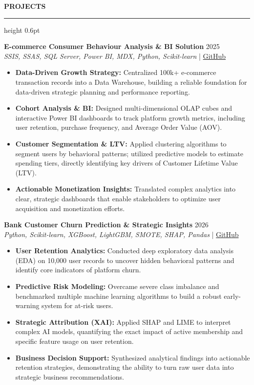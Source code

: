 ﻿\documentclass{resume}
\renewcommand{\sectionskip}{\vspace{5pt}}
\renewcommand{\sectionlineskip}{\vspace{3pt}}
\renewenvironment{rSection}[1]{
  \sectionskip
  {\color{headerblue}\textbf{\MakeUppercase{#1}}}
  \sectionlineskip
  {\color{rulegray}\hrule height 0.6pt}
  \vspace{0pt}
  \begin{list}{}{
    \setlength{\leftmargin}{0em}
    \setlength{\topsep}{0pt}
    \setlength{\partopsep}{0pt}
    \setlength{\parsep}{0pt}
    \setlength{\itemsep}{0pt}
  }
  \item[]
}{
  \end{list}
}
\begin{document}
\begin{rSection}{Projects}
    \item \textbf{E-commerce Consumer Behaviour Analysis \& BI Solution} \hfill 2025\\
    {\small \textit{SSIS, SSAS, SQL Server, Power BI, MDX, Python, Scikit-learn}} \hfill | \href{https://github.com/vietpham10205/Datawarehouse-Olap_Project-E-commerce-Consumer-Behavior-Analysis-BI-Solution}{GitHub}
    {\small
    \begin{itemize}[itemsep=4pt, parsep=0pt, leftmargin=1.2em]
        \item \textbf{Data-Driven Growth Strategy:} Centralized 100k+ e-commerce transaction records into a Data Warehouse, building a reliable foundation for data-driven strategic planning and performance reporting.
        \item \textbf{Cohort Analysis \& BI:} Designed multi-dimensional OLAP cubes and interactive Power BI dashboards to track platform growth metrics, including user retention, purchase frequency, and Average Order Value (AOV).
        \item \textbf{Customer Segmentation \& LTV:} Applied clustering algorithms to segment users by behavioral patterns; utilized predictive models to estimate spending tiers, directly identifying key drivers of Customer Lifetime Value (LTV).
        \item \textbf{Actionable Monetization Insights:} Translated complex analytics into clear, strategic dashboards that enable stakeholders to optimize user acquisition and monetization efforts.
    \end{itemize}
    }
    \vspace{15pt}

    \item \textbf{Bank Customer Churn Prediction \& Strategic Insights} \hfill 2026\\
    {\small \textit{Python, Scikit-learn, XGBoost, LightGBM, SMOTE, SHAP, Pandas}} \hfill | \href{https://github.com/ThanhThang5722/Bank-Customer-Churn-Prediction}{GitHub}
    {\small
    \begin{itemize}[itemsep=4pt, parsep=0pt, leftmargin=1.2em]
        \item \textbf{User Retention Analytics:} Conducted deep exploratory data analysis (EDA) on 10,000 user records to uncover hidden behavioral patterns and identify core indicators of platform churn.
        \item \textbf{Predictive Risk Modeling:} Overcame severe class imbalance and benchmarked multiple machine learning algorithms to build a robust early-warning system for at-risk users.
        \item \textbf{Strategic Attribution (XAI):} Applied SHAP and LIME to interpret complex AI models, quantifying the exact impact of active membership and specific feature usage on user retention.
        \item \textbf{Business Decision Support:} Synthesized analytical findings into actionable retention strategies, demonstrating the ability to turn raw user data into strategic business recommendations.
    \end{itemize}
    }
\end{rSection}
\end{document}
